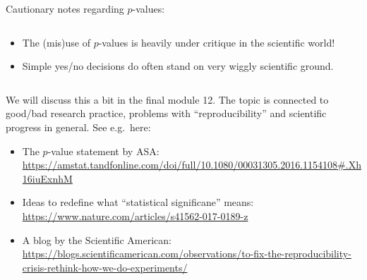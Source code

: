 \documentclass[10pt,ignorenonframetext,]{beamer}
\providecommand{\tightlist}{%
  \setlength{\itemsep}{0pt}\setlength{\parskip}{0pt}}
\begin{document}
\begin{frame}

\begin{block}{Cautionary notes regarding \(p\)-values:}

\(~\)

\begin{itemize}
\item
  The (mis)use of \(p\)-values is heavily under critique in the
  scientific world!
\item
  Simple yes/no decisions do often stand on very wiggly scientific
  ground.
\end{itemize}

\vspace{2mm}

\(~\)

\scriptsize

We will discuss this a bit in the final module 12. The topic is
connected to good/bad research practice, problems with
``reproducibility'' and scientific progress in general. See e.g.~here:

\begin{itemize}
\tightlist
\item
  The \(p\)-value statement by ASA:
  \url{https://amstat.tandfonline.com/doi/full/10.1080/00031305.2016.1154108\#.Xh16iuExnhM}
\item
  Ideas to redefine what ``statistical significane'' means:
  \url{https://www.nature.com/articles/s41562-017-0189-z}
\item
  A blog by the Scientific American:
  \url{https://blogs.scientificamerican.com/observations/to-fix-the-reproducibility-crisis-rethink-how-we-do-experiments/}
\end{itemize}

\end{block}

\end{frame}
\end{document}
